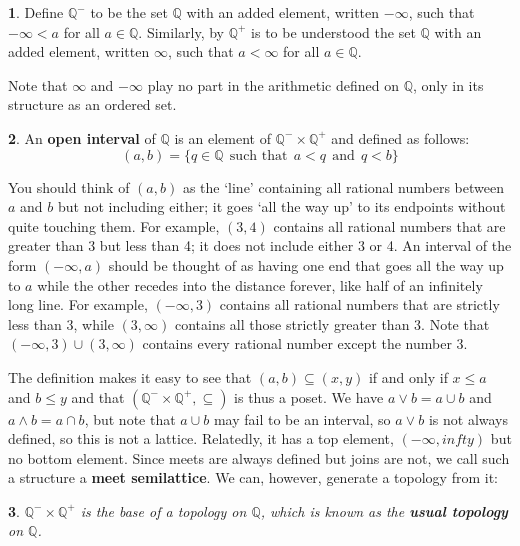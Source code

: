 \documentclass[oneside,english]{amsbook}
\numberwithin{section}{chapter}
\theoremstyle{plain}
\newtheorem{thm}{\protect\theoremname}
\theoremstyle{definition}
\newtheorem{defn}[thm]{\protect\definitionname}
\providecommand{\definitionname}{Definition}
\providecommand{\theoremname}{Theorem}
\begin{document}
\begin{defn}
	Define $\mathbb{Q}^-$ to be the set $\mathbb{Q}$ with an added element, written $-\infty$, such that $-\infty < a$ for all $a\in \mathbb{Q}$. Similarly, by $\mathbb{Q}^+$ is to be understood the set $\mathbb{Q}$ with an added element, written $\infty$, such that $a < \infty$ for all $a\in \mathbb{Q}$.
\end{defn}

Note that $\infty$ and $-\infty$ play no part in the arithmetic defined on $\mathbb{Q}$, only in its structure as an ordered set.

\begin{defn}
	An \textbf{open interval} of $\mathbb{Q}$ is an element of $\mathbb{Q}^-\times\mathbb{Q}^+$ and defined as follows:
	\[
		(a, b) = \{q\in \mathbb{Q} \ \ \text{such that}\ \ a < q\ \ \text{and}\ \ q < b\}
	\]
\end{defn}

You should think of $(a, b)$ as the `line' containing all rational numbers between $a$ and $b$ but not including either; it goes `all the way up' to its endpoints without quite touching them. For example, $(3, 4)$ contains all rational numbers that are greater than 3 but less than 4; it does not include either 3 or 4. An interval of the form $(-\infty, a)$ should be thought of as having one end that goes all the way up to $a$ while the other recedes into the distance forever, like half of an infinitely long line. For example, $(-\infty, 3)$ contains all rational numbers that are strictly less than 3, while $(3, \infty)$ contains all those strictly greater than 3. Note that $(-\infty, 3)\cup(3, \infty)$ contains every rational number except the number 3.

The definition makes it easy to see that $(a, b)\subseteq (x, y)$ if and only if $x\le a$ and $b\le y$ and that $(\mathbb{Q}^-\times\mathbb{Q}^+, \subseteq)$ is thus a poset. We have $a\lor b = a\cup b$ and $a\land b = a\cap b$, but note that $a\cup b$ may fail to be an interval, so $a\lor b$ is not always defined, so this is not a lattice. Relatedly, it has a top element, $(-\infty, infty)$ but no bottom element. Since meets are always defined but joins are not, we call such a structure a \textbf{meet semilattice}. We can, however, generate a topology from it:

\begin{thm}$\mathbb{Q}^-\times\mathbb{Q}^+$ is the base of a topology on $\mathbb{Q}$, which is known as the \textbf{usual topology} on $\mathbb{Q}$.
\end{thm}
\end{document}

